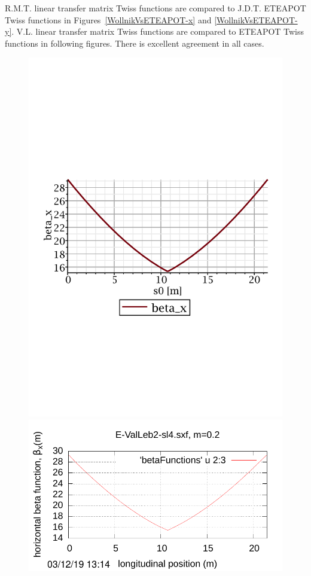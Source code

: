 \documentclass[12]{article}
\begin{document}
R.M.T. linear transfer matrix Twiss functions are compared to J.D.T. ETEAPOT
Twiss functions in Figures~\ref{WollnikVsETEAPOT-x} and \ref{WollnikVsETEAPOT-y}. 
V.L. linear transfer matrix Twiss functions are compared to ETEAPOT
Twiss functions in following figures. 
There is excellent agreement in all cases.

\begin{figure}[hbt]
\begin{minipage}{0.5\linewidth}
\centering
\includegraphics[scale=0.4]{pdf/MAPLE-betax_1cell.pdf}
\end{minipage}
\begin{minipage}{0.5\linewidth}
\centering
\includegraphics[scale=0.7]{pdf/BM-IV_Figure1r.pdf}

\end{minipage}
\end{figure}
\end{document}
